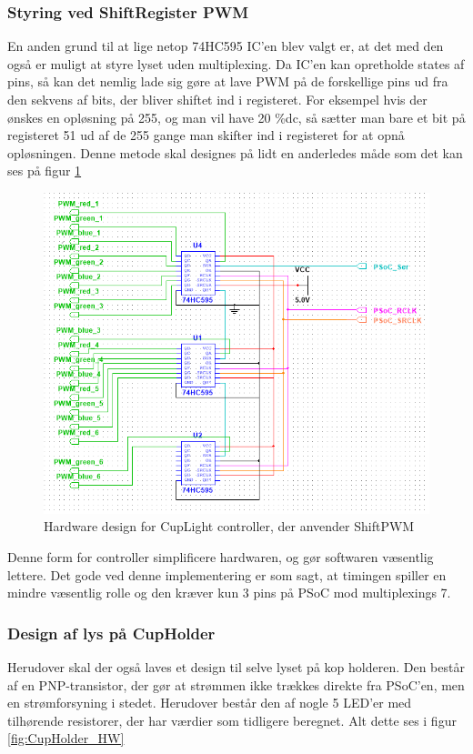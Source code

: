 \documentclass[HardwareDesign/HardwareDesign_main.tex]{subfiles}
\begin{document}
\subsubsection{Styring ved ShiftRegister PWM}
En anden grund til at lige netop 74HC595 IC'en blev valgt er, at det med den også er muligt at styre lyset uden multiplexing. Da IC'en kan opretholde states af pins, så kan det nemlig lade sig gøre at lave PWM på de forskellige pins ud fra den sekvens af bits, der bliver shiftet ind i registeret. For eksempel hvis der ønskes en opløsning på 255, og man vil have 20 \%dc, så sætter man bare et bit på registeret 51 ud af de 255 gange man skifter ind i registeret for at opnå opløsningen.  Denne metode skal designes på lidt en anderledes måde som det kan ses på figur \ref{fig:CupLight_HW_ShiftPWM}
\begin{figure}[H]
    \centering
    \includegraphics[width=\textwidth]{HardwareDesign/CupLight/graphics/CupLight_HW_Controller.png}
    \caption{Hardware design for CupLight controller, der anvender ShiftPWM}
    \label{fig:CupLight_HW_ShiftPWM}
\end{figure}

Denne form for controller simplificere  hardwaren, og gør softwaren væsentlig lettere. Det gode ved denne implementering er som sagt, at timingen spiller en mindre væsentlig rolle og den kræver kun 3 pins på PSoC mod multiplexings 7.\\

\subsubsection{Design af lys på CupHolder}
Herudover skal der også laves et design til selve lyset på kop holderen. Den består af en PNP-transistor, der gør at strømmen ikke trækkes direkte fra PSoC'en, men en strømforsyning i stedet. Herudover består den af nogle 5 LED'er med tilhørende resistorer, der har værdier som tidligere beregnet. Alt dette ses i figur \ref{fig:CupHolder_HW}
\end{document}
